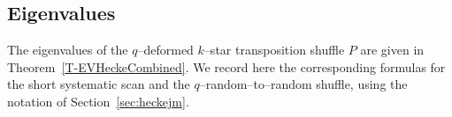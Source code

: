 \documentclass[11pt]{article}
\theoremstyle{plain}  %
\begin{document}

\subsection{Eigenvalues}\label{sec:eigenvalues}



The eigenvalues of the $q$--deformed $k$--star transposition shuffle $P$
are given in Theorem~\ref{T-EVHeckeCombined}. We record here the corresponding formulas for the
short systematic scan and the $q$--random--to--random shuffle, using the
notation of Section~\ref{sec:heckejm}.
\end{document}

